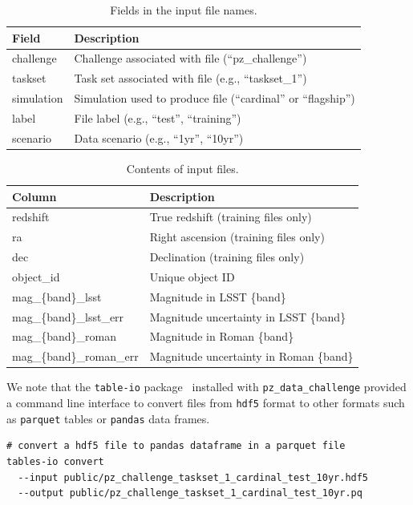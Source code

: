\documentclass[11pt,twoside,letterpaper,onecolumn,english]{article}
\begin{document}
\begin{table}[ht]
\centering
\caption{\label{tab:file_fields}\small Fields in the input file names.}
\begin{tabular}{ll}
  \hline\hline  
  Field & Description \\ \hline
  challenge & Challenge associated with file (``pz\_challenge'') \\
  taskset & Task set associated with file (e.g., ``taskset\_1'') \\
  simulation & Simulation used to produce file (``cardinal'' or ``flagship'') \\
  label & File label (e.g., ``test'', ``training'') \\
  scenario & Data scenario (e.g., ``1yr'', ``10yr'') \\
\hline\hline
\end{tabular}
\end{table}


\begin{table}[ht]
\centering
\caption{\label{tab:columns}\small Contents of input files.}
\begin{tabular}{ll}
  \hline\hline
  Column & Description \\ \hline  
  redshift & True redshift (training files only) \\
  ra & Right ascension (training files only) \\
  dec & Declination (training files only) \\
  object\_id & Unique object ID\\
  mag\_\{band\}\_lsst & Magnitude in LSST \{band\} \\
  mag\_\{band\}\_lsst\_err & Magnitude uncertainty in LSST \{band\} \\
  mag\_\{band\}\_roman & Magnitude in Roman \{band\} \\
  mag\_\{band\}\_roman\_err & Magnitude uncertainty in Roman \{band\} \\
\hline\hline
\end{tabular}
\end{table}

We note that the \texttt{table-io} package~
\cite{tables_io} installed with
\texttt{pz\_data\_challenge} provided a command line interface to
convert files from \texttt{hdf5} format to other formats such as
\texttt{parquet} tables or \texttt{pandas} data frames.

\begin{verbatim}
# convert a hdf5 file to pandas dataframe in a parquet file
tables-io convert
  --input public/pz_challenge_taskset_1_cardinal_test_10yr.hdf5
  --output public/pz_challenge_taskset_1_cardinal_test_10yr.pq
\end{verbatim}
\end{document}
